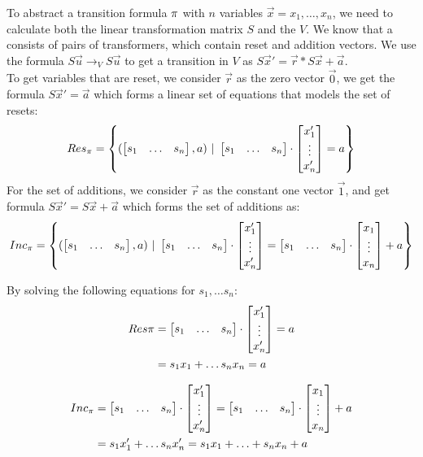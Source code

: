 To abstract a transition formula $\pi$ with $n$ variables $\vec{x} = x_1, \ldots, x_n$, we need to calculate both the linear transformation matrix $S$ and the \qvasr $V$. We know that a \qvasr consists of pairs of transformers, which contain reset and addition vectors. We use the formula $S \vec{u} \rightarrow_V S\vec{u}$ to get a transition in $V$ as $S\vec{x}' = \vec{r}*S\vec{x} + \vec{a}$. \\ To get variables that are reset, we consider $\vec{r}$ as the zero vector $\vec{0}$, we get the formula $S\vec{x}' = \vec{a}$ which forms a linear set of equations that models the set of resets:
\begin{equation*}
	Res_\pi = \left\{ (\begin{bmatrix} s_1 & \ldots &s_n \end{bmatrix}, a)\ |\ \begin{bmatrix} s_1 & \ldots &s_n \end{bmatrix} \cdot \begin{bmatrix} x_1' \\ \vdots \\ x_n' \end{bmatrix} = a \right\}	
\end{equation*}
For the set of additions, we consider $\vec{r}$ as the constant one vector $\vec{1}$, and get formula $S\vec{x}' = S\vec{x} + \vec{a}$ which forms the set of additions as:
\begin{equation*}
	Inc_\pi = \left\{(\begin{bmatrix} s_1 & \ldots &s_n \end{bmatrix}, a)\ |\ \begin{bmatrix} s_1 & \ldots &s_n \end{bmatrix} \cdot \begin{bmatrix} x_1' \\ \vdots \\ x_n' \end{bmatrix} = \begin{bmatrix} s_1 & \ldots &s_n \end{bmatrix} \cdot \begin{bmatrix} x_1 \\ \vdots \\ x_n \end{bmatrix} + a\right\}	
\end{equation*}

\begin{comment}
	\begin{equation*}
	Res_H = \left\{ (\s, a) | H \models \s \cdot \p = a \right\}	
	\end{equation*}
	
	\begin{equation*}
	Inc_H = \left\{(\s, a) | H \models \s \cdot \p = \s \cdot \up + a\right\}	
	\end{equation*}
\end{comment}
By solving the following equations for $s_1, \ldots s_n$: \\
\begin{align*}
	Res\pi &= \begin{bmatrix} s_1 & \ldots &s_n \end{bmatrix} \cdot \begin{bmatrix} x_1' \\ \vdots \\ x_n' \end{bmatrix} = a \\
 			&= s_1x_1 + \ldots s_nx_n = a
\end{align*}

\begin{align*}
	Inc_\trf &= \sn \cdot \pn = \sn \cdot \upn + a  \\ \vspace{0.5cm}
			 &= s_1x_1' + \ldots s_nx_n' = s_1x_1 + \ldots + s_nx_n + a
\end{align*}

